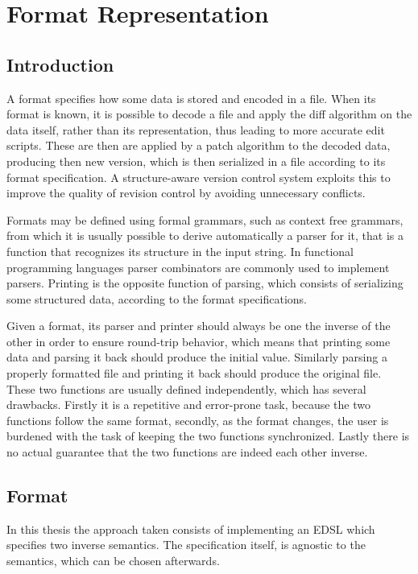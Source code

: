 \documentclass[../Thesis.tex]{subfiles}
\begin{document}
\chapter{Format Representation}

\section{Introduction}
A format specifies how some data is stored and encoded in a file.
When its format is known, it is possible to decode a file and apply the diff algorithm on the data itself, rather than its representation, thus leading to more accurate edit scripts. These are then are applied by a patch algorithm to the decoded data, producing then new version, which is then serialized in a file according to its format specification.
A structure-aware version control system exploits this to improve the quality of revision control by avoiding unnecessary conflicts.

Formats may be defined using formal grammars, such as context free grammars, from which it is usually possible to derive automatically a parser for it, that is a function that recognizes its structure in the input string. In functional programming languages parser combinators are commonly used to implement parsers.
Printing is the opposite function of parsing, which consists of serializing some structured data, according to the format specifications.

Given a format, its parser and printer should always be one the inverse of the other in order to ensure round-trip behavior, which means that printing some data and parsing it back should produce the initial value. Similarly parsing a properly formatted file and printing it back should produce the original file.
These two functions are usually defined independently, which has several drawbacks. Firstly it is a repetitive and error-prone task, because the two functions follow the same format, secondly, as the format changes, the user is burdened with the task of keeping the two functions synchronized. Lastly there is no actual guarantee that the two functions are indeed each other inverse.

\section{Format}
In this thesis the approach taken consists of implementing an EDSL which specifies two inverse semantics. The specification itself, is agnostic to the semantics, which can be chosen afterwards.
\end{document}
